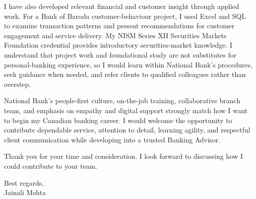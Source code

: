 \documentclass[letterpaper,11pt]{article}
\begin{document}
\bigbreak
I have also developed relevant financial and customer insight through applied work. For a Bank of Baroda customer-behaviour project, I used Excel and SQL to examine transaction patterns and present recommendations for customer engagement and service delivery. My NISM Series XII Securities Markets Foundation credential provides introductory securities-market knowledge. I understand that project work and foundational study are not substitutes for personal-banking experience, so I would learn within National Bank's procedures, seek guidance when needed, and refer clients to qualified colleagues rather than overstep.

\bigbreak
National Bank's people-first culture, on-the-job training, collaborative branch team, and emphasis on empathy and digital support strongly match how I want to begin my Canadian banking career. I would welcome the opportunity to contribute dependable service, attention to detail, learning agility, and respectful client communication while developing into a trusted Banking Advisor.

\bigbreak
Thank you for your time and consideration. I look forward to discussing how I could contribute to your team.

\bigbreak
Best regards,\\
Jainali Mehta
\end{document}
